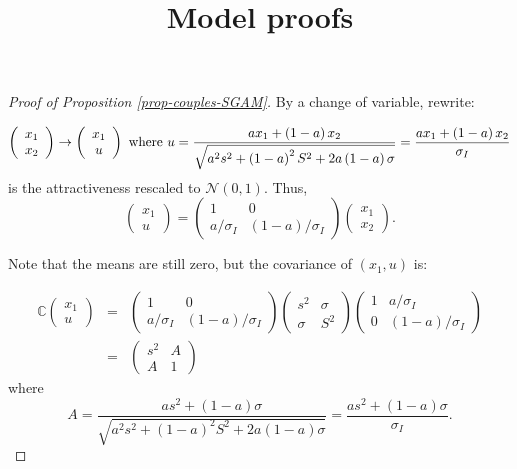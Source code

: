\documentclass[
]{article}
\title{Model proofs}
\author{}
\date{\vspace{-2.5em}}
\theoremstyle{definition}
\theoremstyle{definition}
\theoremstyle{definition}
\theoremstyle{definition}
\theoremstyle{remark}
\begin{document}
\maketitle

\begin{proof}[Proof of Proposition \ref{prop-couples-SGAM}]

By a change of variable, rewrite:

\[
\left( 
\begin{array}{c}
x_{1} \\ 
x_{2}%
\end{array}%
\right) \rightarrow \left( 
\begin{array}{c}
x_{1} \\ 
u%
\end{array}%
\right) \text{ where }u=\frac{ax_{1}+\left( 1-a\right) x_{2}}{\sqrt{%
a^{2}s^{2}+\left( 1-a\right) ^{2}S^{2}+2a\left( 1-a\right) \sigma }}=
\frac{ax_{1}+\left( 1-a\right) x_{2}}{\sigma_I}
\]
is the attractiveness rescaled to $\mathcal{N}(0, 1)$. Thus,
\[
\left( 
\begin{array}{c}
x_{1} \\ 
u
\end{array}
\right) = \left( 
\begin{array}{cc}
1 & 0 \\ 
a/\sigma_I & (1-a)/\sigma_I%
\end{array}%
\right) \left( 
\begin{array}{c}
x_{1} \\ 
x_{2}%
\end{array}%
\right). 
\]


Note that the means are still zero, but the covariance of $(x_1,u)$ is:

\begin{eqnarray*}
\mathbb{C}\left( 
\begin{array}{c}
x_{1} \\ 
u
\end{array}
\right) &=&\left( 
\begin{array}{cc}
1 & 0 \\ 
a/\sigma_I & \left( 1-a\right)/\sigma_I%
\end{array}%
\right) \left( 
\begin{array}{cc}
s^{2} & \sigma \\ 
\sigma & S^{2}%
\end{array}%
\right) \left( 
\begin{array}{cc}
1 & a/\sigma_I \\ 
0 & \left( 1-a\right)/\sigma_I%
\end{array}%
\right) \\
&=&\left( 
\begin{array}{cc}
s^{2} &  A \\ 
A & 1 
\end{array}%
\right) \allowbreak 
\end{eqnarray*}
where
\[
A=\frac{
as^{2}+\left( 1-a\right) \sigma 
}{
\sqrt{
a^{2}s^{2} + (1-a)^2S^{2}
+ 2a\left(1-a\right)\sigma 
}} = 
\frac{as^{2}+\left( 1-a\right) \sigma }{\sigma_I}.
\]


\end{proof}
\end{document}
